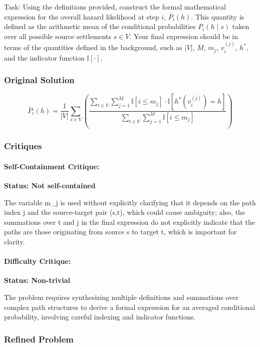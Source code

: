 \documentclass[10pt]{article}
\begin{document}
Task:
Using the definitions provided, construct the formal mathematical expression for the overall hazard likelihood at step $i$, $\bar{P}_i(h)$. This quantity is defined as the arithmetic mean of the conditional probabilities $P_i(h \mid s)$ taken over all possible source settlements $s \in V$. Your final expression should be in terms of the quantities defined in the background, such as $|V|$, $M$, $m_j$, $v^{(j)}_i$, $h^*$, and the indicator function $\mathbb{I}[\cdot]$.

\subsubsection*{Original Solution}
\[ \bar{P}_i(h) = \frac{1}{|V|} \sum_{s \in V} \left( \frac{\sum_{t \in V} \sum_{j=1}^{M} \mathbb{I}[i \leq m_j] \cdot \mathbb{I}[h^*(v^{(j)}_i) = h]}{\sum_{t \in V} \sum_{j=1}^{M} \mathbb{I}[i \leq m_j]} \right) \]

\subsubsection*{Critiques}
\paragraph*{Self-Containment Critique:}
\textcolor{fail}{\textbf{Status: Not self-contained}}

The variable m_j is used without explicitly clarifying that it depends on the path index j and the source-target pair (s,t), which could cause ambiguity; also, the summations over t and j in the final expression do not explicitly indicate that the paths are those originating from source s to target t, which is important for clarity.


\paragraph*{Difficulty Critique:}
\textcolor{pass}{\textbf{Status: Non-trivial}}

The problem requires synthesizing multiple definitions and summations over complex path structures to derive a formal expression for an averaged conditional probability, involving careful indexing and indicator functions.


\subsubsection*{Refined Problem}
\end{document}

